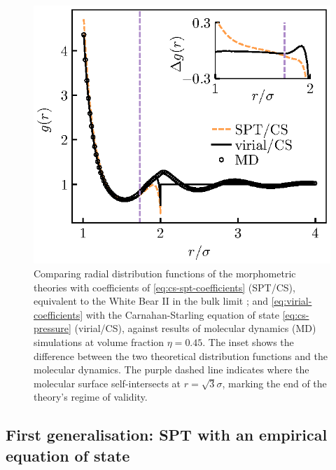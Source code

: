 \documentclass[11pt,twoside]{report}
\begin{document}
\begin{figure}
  \includegraphics[width=0.9\linewidth,outer]{g2-phi045}
  \caption[Accuracy of pair distribution functions $g^{(2)}(r)$]{
    Comparing radial distribution functions of the morphometric theories with coefficients of \eqref{eq:cs-spt-coefficients} (SPT/CS), equivalent to the White Bear II in the bulk limit \cite{Hansen-GoosJPCM2006}; and \eqref{eq:virial-coefficients} with the Carnahan-Starling equation of state \eqref{eq:cs-pressure} (virial/CS), against results of molecular dynamics (MD) simulations at volume fraction $\eta = 0.45$.
    The inset shows the difference between the two theoretical distribution functions and the molecular dynamics.
    The purple dashed line indicates where the molecular surface self-intersects at $r = \sqrt{3} \sigma$, marking the end of the theory's regime of validity.}
  \label{fig:g2-full}
\end{figure}

\subsection{First generalisation: SPT with an empirical equation of state}
\label{sec:cs-spt}
\end{document}
